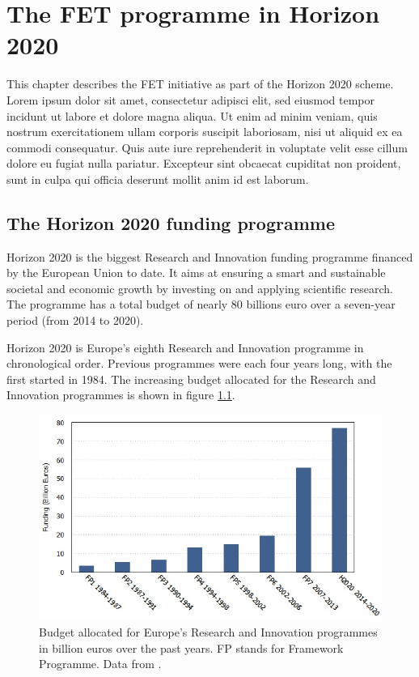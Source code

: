 \chapter{The FET programme in Horizon 2020}
This chapter describes the FET initiative as part of the Horizon 2020 scheme. Lorem ipsum dolor sit amet, consectetur adipisci elit, sed eiusmod tempor incidunt ut labore et dolore magna aliqua. Ut enim ad minim veniam, quis nostrum exercitationem ullam corporis suscipit laboriosam, nisi ut aliquid ex ea commodi consequatur. Quis aute iure reprehenderit in voluptate velit esse cillum dolore eu fugiat nulla pariatur. Excepteur sint obcaecat cupiditat non proident, sunt in culpa qui officia deserunt mollit anim id est laborum.

\section{The Horizon 2020 funding programme}
Horizon 2020 is the biggest Research and Innovation funding programme financed by the European Union to date. It aims at ensuring a smart and sustainable societal and economic growth by investing on and applying scientific research. The programme has a total budget of nearly 80 billions euro over a seven-year period (from 2014 to 2020).

Horizon 2020 is Europe's eighth Research and Innovation programme in chronological order. Previous programmes were each four years long, with the first started in 1984. The increasing budget allocated for the Research and Innovation programmes is shown in figure \ref{FP_funds}.

\begin{figure}[!t] 
 \begin{center}
 \includegraphics[scale=0.4]{Images/FP_funds.jpg}
 \caption{Budget allocated for Europe's Research and Innovation programmes in billion euros over the past years. FP stands for Framework Programme. Data from \cite{OECD}.}
 \label{FP_funds}
 \end{center}
\end{figure}

